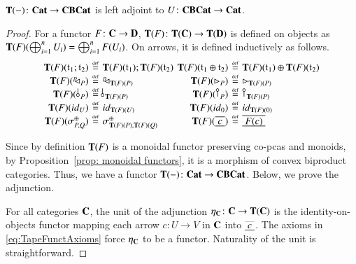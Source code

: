 \begin{theorem}\label{thm:syntacticadjunction}
$\mathbf{T}(-)\colon \mathbf{Cat} \to \mathbf{CBCat}$ is left adjoint to $U\colon \mathbf{CBCat} \to \mathbf{Cat} $.
\end{theorem}
\begin{proof}
For a functor $F\colon \mathbf{C} \to \mathbf{D}$, $\mathbf{T}(F) \colon \mathbf{T}(\mathbf{C}) \to \mathbf{T}(\mathbf{D})$ is defined on objects as $\mathbf{T}(F)(\bigoplus_{i=1}^nU_i) = \bigoplus_{i=1}^nF(U_i)$.
On arrows, it is defined inductively as follows.
\[
\setlength{\arraycolsep}{2pt} %
\begin{array}{rcl rcl}
  \CatTapeF(\t_1 ; \t_2)      &\defeq& \CatTapeF(\t_1);\CatTapeF(\t_2) &
  \CatTapeF(\t_1 \piu \t_2)   &\defeq& \CatTapeF(\t_1)\oplus\CatTapeF(\t_2) \\
  
  \CatTapeF(\diagp{P})        &\defeq& \diagp{\CatTapeF(P)} &
  \CatTapeF(\codiag{P})       &\defeq& \codiag{\CatTapeF(P)} \\
  
  \CatTapeF(\,\bangp{P})        &\defeq& \bangp{\CatTapeF(P)} &
  \CatTapeF(\cobang{P})       &\defeq& \cobang{\CatTapeF(P)} \\
  
  \CatTapeF(\id{U})           &\defeq& \id{\CatTapeF(U)} &
  \CatTapeF(\id{\zero})       &\defeq& \id{\CatTapeF(\zero)} \\
  
  \CatTapeF(\sigma_{P,Q}^{\piu}) &\defeq& \sigma_{\CatTapeF(P),\CatTapeF(Q)}^{\piu} &
  \CatTapeF(\tapeFunct{c})    &\defeq& \tapeFunct{F(c)}
\end{array}
\]


Since by definition $\mathbf{T}(F)$ is a monoidal functor preserving co-pcas and monoids, by Proposition~\ref{prop: monoidal functors}, it is a morphism of convex biproduct categories.
%
Thus, we have a functor $\mathbf{T}(-)\colon \mathbf{Cat} \to \mathbf{CBCat}$. Below, we prove the adjunction.

For all categories $\mathbf{C}$, the unit of the adjunction $\eta_{\mathbf{C}} \colon \mathbf{C} \to \mathbf{T}(\mathbf{C})$ is the identity-on-objects functor mapping each arrow $c\colon U\to V$ in $\mathbf{C}$ into $\tapeFunct{c}$. The axioms in \eqref{eq:TapeFunctAxioms} force $\eta_{\mathbf{C}}$ to be a functor. Naturality of the unit is straightforward.


\end{proof}
